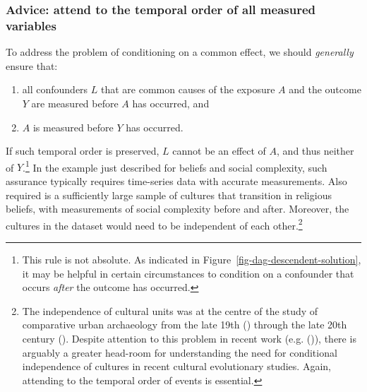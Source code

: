 \documentclass[
  singlecolumn,
  9pt]{article}
\providecommand{\tightlist}{%
  \setlength{\itemsep}{0pt}\setlength{\parskip}{0pt}}\usepackage{longtable,booktabs,array}
\begin{document}
\subsubsection{Advice: attend to the temporal order of all measured
variables}\label{advice-attend-to-the-temporal-order-of-all-measured-variables-1}

To address the problem of conditioning on a common effect, we should
\emph{generally} ensure that:

\begin{enumerate}
\def\labelenumi{\arabic{enumi}.}
\tightlist
\item
  all confounders \(L\) that are common causes of the exposure \(A\) and
  the outcome \(Y\) are measured before \(A\) has occurred, and
\item
  \(A\) is measured before \(Y\) has occurred.
\end{enumerate}

If such temporal order is preserved, \(L\) cannot be an effect of \(A\),
and thus neither of \(Y\).\footnote{This rule is not absolute. As
  indicated in Figure~\ref{fig-dag-descendent-solution}, it may be
  helpful in certain circumstances to condition on a confounder that
  occurs \emph{after} the outcome has occurred.} In the example just
described for beliefs and social complexity, such assurance typically
requires time-series data with accurate measurements. Also required is a
sufficiently large sample of cultures that transition in religious
beliefs, with measurements of social complexity before and after.
Moreover, the cultures in the dataset would need to be independent of
each other.\footnote{The independence of cultural units was at the
  centre of the study of comparative urban archaeology from the late
  19th () through the
  late 20th century ().
  Despite attention to this problem in recent work (e.g.
  ()), there is
  arguably a greater head-room for understanding the need for
  conditional independence of cultures in recent cultural evolutionary
  studies. Again, attending to the temporal order of events is
  essential.}
\end{document}
